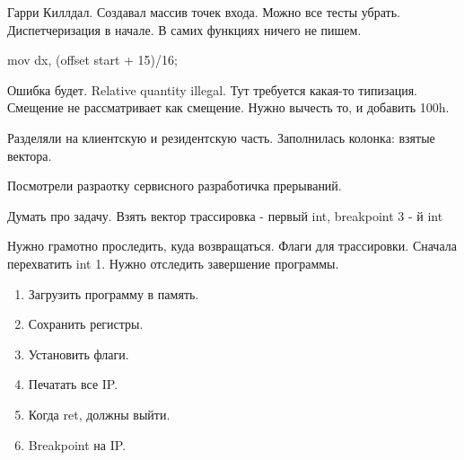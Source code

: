 Гарри Киллдал. Создавал массив точек входа. Можно все тесты убрать. Диспетчеризация в начале. В самих функциях ничего не пишем.

mov dx, (offset start + 15)/16;

Ошибка будет. Relative quantity illegal. Тут требуется какая-то типизация. Смещение не рассматривает как смещение. Нужно вычесть то, и добавить 100h.

Разделяли на клиентскую и резидентскую часть. Заполнилась колонка: взятые вектора.

Посмотрели разраотку сервисного разработичка прерываний. 
\begin{hw} Думать про задачу. Взять вектор трассировка - первый int, breakpoint 3 - й int \end{hw}

Нужно грамотно проследить, куда возвращаться. Флаги для трассировки. Сначала перехватить int 1. Нужно отследить завершение программы. 
\begin{enumerate}
\item Загрузить программу в память. 
\item Сохранить регистры.
\item Установить флаги.
\item Печатать все IP.  
\item Когда ret, должны выйти.
\item Breakpoint на IP. 
\end{enumerate}